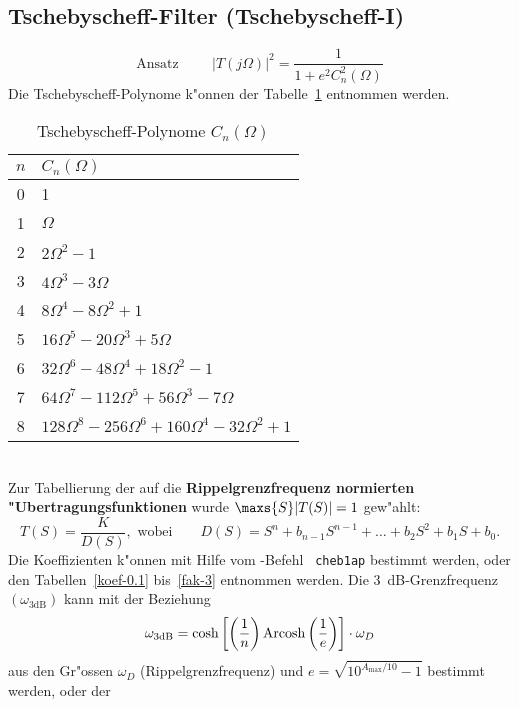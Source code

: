 \subsection{Tschebyscheff-Filter (Tschebyscheff-I)}\label{anhang_Tschebyscheff}
\[\mbox{Ansatz}\hspace{1cm}|T(j\Omega)|^{2}=\frac{1}{1+e^{2}C_{n}^{2}(\Omega)}\]
Die Tschebyscheff-Polynome k"onnen der Tabelle~\ref{c-poly} entnommen werden.
\begin{table}[!htb]
\begin{center}
{\footnotesize
\begin{tabular}{|c||l|}\hline
$n$ &  $C_{n}(\Omega)$\\ \hline\hline
 0 & 1 \\ \hline
 1 & $\Omega$     \\ \hline
 2 & $2\Omega^2-1$ \\ \hline
 3 & $4\Omega^3-3\Omega$  \\ \hline
 4 & $8\Omega^4-8\Omega^2+1$ \\ \hline
 5 & $16\Omega^5-20\Omega^3+5\Omega$    \\ \hline
 6 & $32\Omega^6-48\Omega^4+18\Omega^2-1$  \\ \hline   
 7 & $64\Omega^7-112\Omega^5+56\Omega^3-7\Omega$   \\ \hline   
 8 & $128\Omega^8-256\Omega^6+160\Omega^4-32\Omega^2+1$  \\ \hline
\end{tabular}\caption{Tschebyscheff-Polynome $C_{n}(\Omega)$ \label{c-poly}}
}
\end{center}
\end{table}\\
\nit Zur Tabellierung der auf die {\bf Rippelgrenzfrequenz normierten 
"Uber\-tra\-gungs\-funk\-tionen} wurde $\maxs{S}|T(S)|=1$ gew"ahlt:
\begin{equation*}
T(S)=\frac{K}{D(S)},\text{ wobei}\qquad D(S)=S^{n}+b_{n-1}S^{n-1}+ \ldots + b_{2}S^{2}+b_{1}S+b_{0}. 
\end{equation*}
\nit Die Koeffizienten k"onnen mit Hilfe vom \matlogo-Befehl {\tt
  cheb1ap} bestimmt werden, oder den Tabellen~\ref{koef-0.1}
bis~\ref{fak-3} entnommen werden.  Die
3~dB-Grenzfrequenz $(\omega_{\text{3dB}})$
kann mit der Beziehung
\[\omega_{\text{3dB}}=\cosh{\left[\left(\frac{1}{n}\right){\rm Arcosh}\left(\frac{1}{e}\right)\right]} \cdot
\omega_{D} \] aus den Gr"ossen $\omega_{D}$ (Rippelgrenzfrequenz) und
$e=\sqrt{10^{A_{\max}/10}-1}$ bestimmt werden, oder der
